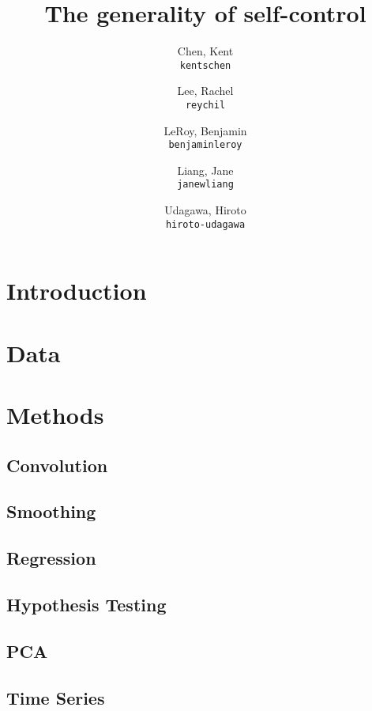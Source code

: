 \documentclass[11pt]{article}
\title{The generality of self-control}
\author{
  Chen, Kent\\
  \texttt{kentschen}
  \and
  Lee, Rachel\\
  \texttt{reychil}
  \and
  LeRoy, Benjamin\\
  \texttt{benjaminleroy}
  \and
  Liang, Jane\\
  \texttt{janewliang}
  \and
  Udagawa, Hiroto\\
  \texttt{hiroto-udagawa}
}
\begin{document}
\maketitle

\abstract{}

\section{Introduction}
	

\section{Data}

	
	
\section{Methods}

	\subsection{Convolution}
		
	
	\subsection{Smoothing}
	
		
		
	\subsection{Regression}
	
		
		
	\subsection{Hypothesis Testing}
	
		
		
	\subsection{PCA}
	
		
		
	\subsection{Time Series}
	
\end{document}

